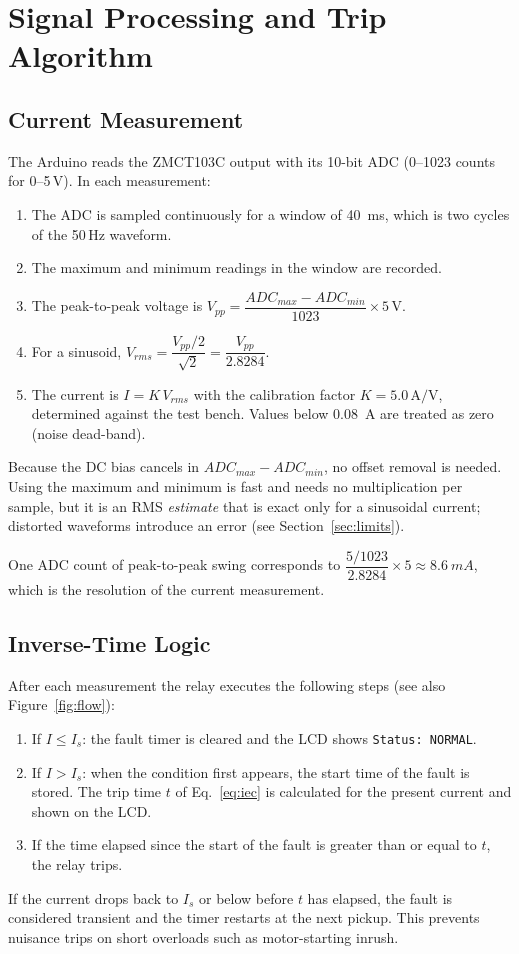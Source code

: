 \documentclass[12pt, a4paper]{article}
\begin{document}
\newpage

\section{Signal Processing and Trip Algorithm}

\subsection{Current Measurement}
The Arduino reads the ZMCT103C output with its 10-bit ADC (0--1023 counts for 0--5\,V). In each measurement:
\begin{enumerate}[nosep]
  \item The ADC is sampled continuously for a window of \SI{40}{ms}, which is two cycles of the 50\,Hz waveform.
  \item The maximum and minimum readings in the window are recorded.
  \item The peak-to-peak voltage is $V_{pp} = \dfrac{ADC_{max} - ADC_{min}}{1023}\times 5\,\mathrm{V}$.
  \item For a sinusoid, $V_{rms} = \dfrac{V_{pp}/2}{\sqrt{2}} = \dfrac{V_{pp}}{2.8284}$.
  \item The current is $I = K\,V_{rms}$ with the calibration factor $K = 5.0\,\mathrm{A/V}$, determined against the test bench. Values below \SI{0.08}{A} are treated as zero (noise dead-band).
\end{enumerate}
Because the DC bias cancels in $ADC_{max} - ADC_{min}$, no offset removal is needed. Using the maximum and minimum is fast and needs no multiplication per sample, but it is an RMS \emph{estimate} that is exact only for a sinusoidal current; distorted waveforms introduce an error (see Section~\ref{sec:limits}).

One ADC count of peak-to-peak swing corresponds to $\dfrac{5/1023}{2.8284}\times 5 \approx \SI{8.6}{mA}$, which is the resolution of the current measurement.

\subsection{Inverse-Time Logic}
After each measurement the relay executes the following steps (see also Figure~\ref{fig:flow}):
\begin{enumerate}[nosep]
  \item If $I \le I_s$: the fault timer is cleared and the LCD shows \texttt{Status: NORMAL}.
  \item If $I > I_s$: when the condition first appears, the start time of the fault is stored. The trip time $t$ of Eq.~\eqref{eq:iec} is calculated for the present current and shown on the LCD.
  \item If the time elapsed since the start of the fault is greater than or equal to $t$, the relay trips.
\end{enumerate}
If the current drops back to $I_s$ or below before $t$ has elapsed, the fault is considered transient and the timer restarts at the next pickup. This prevents nuisance trips on short overloads such as motor-starting inrush.
\end{document}
